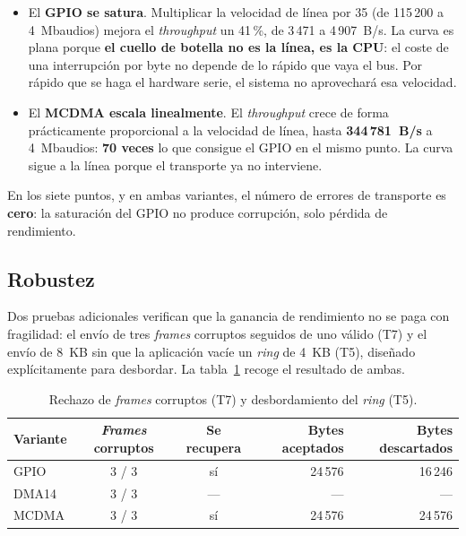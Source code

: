 \begin{itemize}
    \item El \textbf{GPIO se satura}. Multiplicar la velocidad de línea por 35 (de 115\,200 a
    4~Mbaudios) mejora el \textit{throughput} un 41\,\%, de 3\,471 a 4\,907~B/s. La curva es
    plana porque \textbf{el cuello de botella no es la línea, es la CPU}: el coste de una
    interrupción por byte no depende de lo rápido que vaya el bus. Por rápido que se haga el
    hardware serie, el sistema no aprovechará esa velocidad.

    \item El \textbf{MCDMA escala linealmente}. El \textit{throughput} crece de forma
    prácticamente proporcional a la velocidad de línea, hasta \textbf{344\,781~B/s} a
    4~Mbaudios: \textbf{70 veces} lo que consigue el GPIO en el mismo punto. La curva sigue a la
    línea porque el transporte ya no interviene.
\end{itemize}

En los siete puntos, y en ambas variantes, el número de errores de transporte es \textbf{cero}: la
saturación del GPIO no produce corrupción, solo pérdida de rendimiento.

\subsection{Robustez}

Dos pruebas adicionales verifican que la ganancia de rendimiento no se paga con fragilidad: el
envío de tres \textit{frames} corruptos seguidos de uno válido (T7) y el envío de 8~KB sin que la
aplicación vacíe un \textit{ring} de 4~KB (T5), diseñado explícitamente para desbordar. La
tabla~\ref{tab:bench_robustez} recoge el resultado de ambas.

\begin{table}[H]
    \centering
    \small
    \begin{tabular}{lccrr}
        \hline
        \textbf{Variante} & \textbf{\textit{Frames} corruptos} & \textbf{Se recupera} & \textbf{Bytes aceptados} & \textbf{Bytes descartados} \\
        \hline
        GPIO  & 3 / 3 & sí & 24\,576 & 16\,246 \\
        DMA14 & 3 / 3 & --- & --- & --- \\
        MCDMA & 3 / 3 & sí & 24\,576 & 24\,576 \\
        \hline
    \end{tabular}
    \caption{Rechazo de \textit{frames} corruptos (T7) y desbordamiento del \textit{ring} (T5).}
    \label{tab:bench_robustez}
\end{table}

